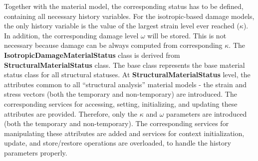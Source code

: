 \documentclass[a4paper]{article}
\newcommand{\class}[1]{{\bf #1}}
\begin{document}
 Together with the material model, the corresponding status has to be
 defined, containing all necessary history variables.
 For the isotropic-based damage models, the only history variable is 
 the value of the largest strain level ever reached ($\kappa$).
 In addition, the corresponding damage level $\omega$ will be stored.
 This is not necessary because damage can be always computed from
 corresponding $\kappa$.
 The \class{IsotropicDamageMaterialStatus} class is derived from 
 \class{StructuralMaterialStatus} class. The base class represents the
 base material status class for all structural statuses. At
 \class{StructuralMaterialStatus} level, the attributes common to all
 ``structural analysis'' material models - the strain and
 stress vectors (both the temporary and non-temporary) are introduced. The
 corresponding services for accessing, setting, initializing, and
 updating these attributes are provided.
 Therefore, only the $\kappa$ and $\omega$ parameters are introduced
 (both the temporary and non-temporary). The corresponding services for
 manipulating these attributes are added and services for context
 initialization, update, and store/restore operations are overloaded, to
 handle the history parameters properly.
\end{document}
